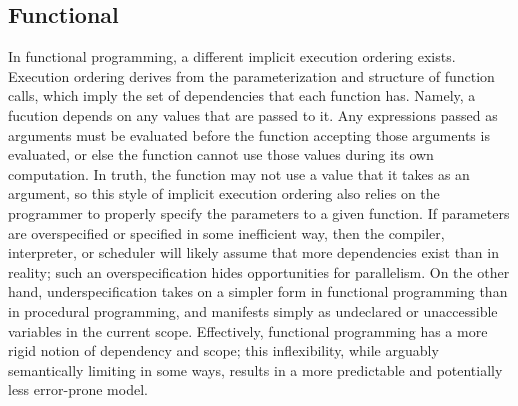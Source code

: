 \subsection{Functional}
In functional programming, a different implicit execution ordering exists.
Execution ordering derives from the parameterization and structure of function
calls, which imply the set of dependencies that each function has. Namely, a
fucution depends on any values that are passed to it. Any expressions passed as
arguments must be evaluated before the function accepting those arguments is
evaluated, or else the function cannot use those values during its own
computation. In truth, the function may not use a value that it takes as an
argument, so this style of implicit execution ordering also relies on the
programmer to properly specify the parameters to a given function. If parameters
are overspecified or specified in some inefficient way, then the compiler,
interpreter, or scheduler will likely assume that more dependencies exist than
in reality; such an overspecification hides opportunities for parallelism. On
the other hand, underspecification takes on a simpler form in functional
programming than in procedural programming, and manifests simply as undeclared
or unaccessible variables in the current scope. Effectively, functional
programming has a more rigid notion of dependency and scope; this inflexibility,
while arguably semantically limiting in some ways, results in a more predictable
and potentially less error-prone model.

